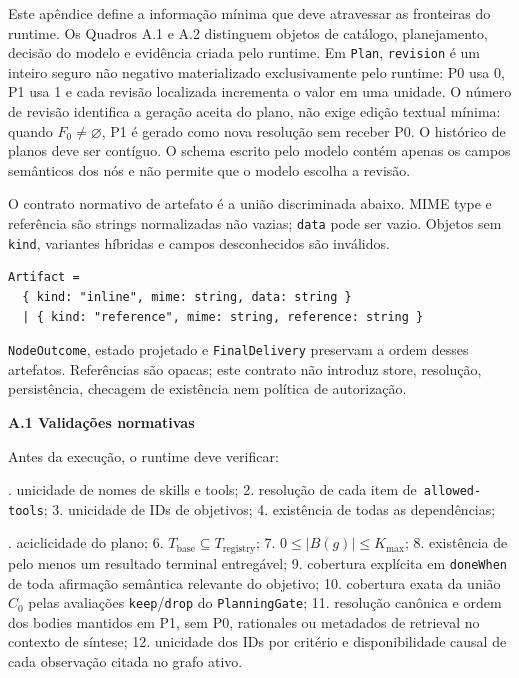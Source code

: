 \documentclass[12pt,a4paper]{article}
\begin{document}
Este apêndice define a informação mínima que deve atravessar as fronteiras do runtime. Os Quadros A.1 e A.2 distinguem objetos de catálogo, planejamento, decisão do modelo e evidência criada pelo runtime. Em \texttt{Plan}, \texttt{revision} é um inteiro seguro não negativo materializado exclusivamente pelo runtime: P0 usa 0, P1 usa 1 e cada revisão localizada incrementa o valor em uma unidade. O número de revisão identifica a geração aceita do plano, não exige edição textual mínima: quando \(F_0 \neq \varnothing\), P1 é gerado como nova resolução sem receber P0. O histórico de planos deve ser contíguo. O schema escrito pelo modelo contém apenas os campos semânticos dos nós e não permite que o modelo escolha a revisão.

O contrato normativo de artefato é a união discriminada abaixo. MIME type e referência são strings normalizadas não vazias; \texttt{data} pode ser vazio. Objetos sem \texttt{kind}, variantes híbridas e campos desconhecidos são inválidos.

\begin{Verbatim}[breaklines=true,breakanywhere=true,fontsize=\small]
Artifact =
  { kind: "inline", mime: string, data: string }
  | { kind: "reference", mime: string, reference: string }
\end{Verbatim}

\texttt{NodeOutcome}, estado projetado e \texttt{FinalDelivery} preservam a ordem desses artefatos. Referências são opacas; este contrato não introduz store, resolução, persistência, checagem de existência nem política de autorização.






\textbf{A.1 Validações normativas}


Antes da execução, o runtime deve verificar:


. unicidade de nomes de skills e tools; 2. resolução de cada item de\texttt{ allowed-tools}; 3. unicidade de IDs de objetivos; 4. existência de todas as dependências;\par


. aciclicidade do plano; 6. $T_{\mathrm{base}} \subseteq T_{\mathrm{registry}}$; 7. $0 \leq |B(g)| \leq K_{\max}$; 8. existência de pelo menos um resultado terminal entregável; 9. cobertura explícita em \texttt{doneWhen} de toda afirmação semântica relevante do objetivo; 10. cobertura exata da união \(C_0\) pelas avaliações \texttt{keep}/\texttt{drop} do \texttt{PlanningGate}; 11. resolução canônica e ordem dos bodies mantidos em P1, sem P0, rationales ou metadados de retrieval no contexto de síntese; 12. unicidade dos IDs por critério e disponibilidade causal de cada observação citada no grafo ativo.\par
\end{document}
